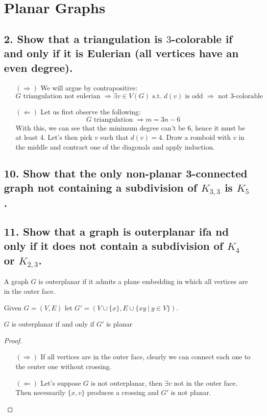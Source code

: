 \section{Planar Graphs}

\subsection[Planar Graphs 2]{2. Show that a triangulation is $3$-colorable if and only if it is Eulerian (all vertices have an even degree).}

\begin{itemize}
    \item[$(\Rightarrow)$] We will argue by contrapositive:
        $$ G \text{ triangulation not eulerian } \Rightarrow \exists v \in V(G) \text{ s.t. } d(v) \text{ is odd } \Rightarrow \text{ not 3-colorable }$$
    \item[$(\Leftarrow)$] Let us first observe the following:
        $$ G \text{ triangulation } \Rightarrow m = 3n -6$$
        With this, we can see that the minimum degree can't be 6, hence it must be at least 4.
        Let's then pick $v$ such that $d(v) = 4$.
        Draw a romboid with $v$ in the middle and contract one of the diagonals and apply induction.
\end{itemize}


\subsection[Planar Graphs 10]{10. Show that the only non-planar 3-connected graph not containing a subdivision of $K_{3,3}$ is $K_5$.}

\subsection[Planar Graphs 11]{11. Show that a graph is outerplanar ifa nd only if it does not contain a subdivision of $K_4$ or $K_{2,3}$.}

\begin{definition}
    A graph $G$ is outerplanar if it admits a plane embedding in which all vertices are in the outer face.
\end{definition}

Given $G = (V, E)$ let $G' = (V \cup \{ x\}, E \cup \{ xy \: | \: y \in V \})$.

\begin{claim}
    $G$ is outerplanar if and only if $G'$ is planar
\end{claim}
\begin{proof}
    \begin{itemize}
        \item[$(\Rightarrow)$] If all vertices are in the outer face, clearly we can connect each one to the center one without crossing.
        \item[$(\Leftarrow)$] Let's suppose $G$ is not outerplanar, then $\exists v$ not in the outer face.
            Then necessarily $\{x , v\}$ produces a crossing and $G'$ is not planar.
    \end{itemize}
\end{proof}

